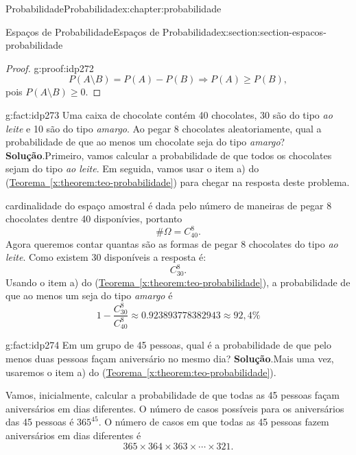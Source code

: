 \documentclass[oneside,10pt,]{book}
\newcommand{\blocktitlefont}{\relax}
\newcommand{\xreffont}{\relax}
\numberwithin{equation}{section}
\begin{document}
\begin{chapterptx}{Probabilidade}{}{Probabilidade}{}{}{x:chapter:probabilidade}
\begin{sectionptx}{Espaços de Probabilidade}{}{Espaços de Probabilidade}{}{}{x:section:section-espacos-probabilidade}
\begin{proof}{}{g:proof:idp272}
\begin{equation*}
P(A\setminus B) = P(A) - P(B)\Rightarrow P(A) \geq P(B),
\end{equation*}
pois \(P(A\setminus B)\geq 0\).%
\end{proof}
\begin{fact}{}{}{g:fact:idp273}%
Uma caixa de chocolate contém 40 chocolates, 30 são do tipo \emph{ao leite} e 10 são do tipo \emph{amargo}. Ao pegar 8 chocolates aleatoriamente, qual a probabilidade de que ao menos um chocolate seja do tipo \emph{amargo}?%
\textbf{\blocktitlefont Solução}.\quad{}Primeiro, vamos calcular a probabilidade de que todos os chocolates sejam do tipo \emph{ao leite}. Em seguida, vamos usar o item a) do (\hyperref[x:theorem:teo-probabilidade]{Teorema~{\xreffont\ref{x:theorem:teo-probabilidade}}}) para chegar na resposta deste problema.%
\par
cardinalidade do espaço amostral é dada pelo número de maneiras de pegar 8 chocolates dentre 40 disponívies, portanto%
\begin{equation*}
\#\Omega = C_{40}^{8}.
\end{equation*}
Agora queremos contar quantas são as formas de pegar 8 chocolates do tipo \emph{ao leite}. Como existem 30 disponíveis a resposta é:%
\begin{equation*}
C_{30}^{8}. 
\end{equation*}
Usando o item a) do (\hyperref[x:theorem:teo-probabilidade]{Teorema~{\xreffont\ref{x:theorem:teo-probabilidade}}}), a probabilidade de que ao menos um seja do tipo \emph{amargo} é%
\begin{equation*}
1 - \frac{C_{30}^{8}}{C_{40}^{8}} \approx 0.923893778382943 \approx 92,4\% 
\end{equation*}
%
\end{fact}
\begin{fact}{}{}{g:fact:idp274}%
Em um grupo de 45 pessoas, qual é a probabilidade de que pelo menos duas pessoas façam aniversário no mesmo dia?%
\textbf{\blocktitlefont Solução}.\quad{}Mais uma vez, usaremos o item a) do (\hyperref[x:theorem:teo-probabilidade]{Teorema~{\xreffont\ref{x:theorem:teo-probabilidade}}}).%
\par
Vamos, inicialmente, calcular a probabilidade de que todas as 45 pessoas façam aniversários em dias diferentes. O número de casos possíveis para os aniversários das 45 pessoas é \(365^{45}\). O número de casos em que todas as 45 pessoas fazem aniversários em dias diferentes é%
\begin{equation*}
365\times 364\times 363\times \cdots \times321. 
\end{equation*}

\end{fact}
\end{sectionptx}
\end{chapterptx}
\end{document}
